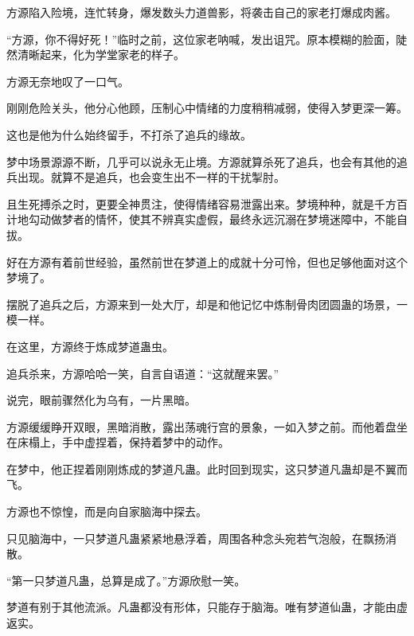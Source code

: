 \begin{this_body}
方源陷入险境，连忙转身，爆发数头力道兽影，将袭击自己的家老打爆成肉酱。

“方源，你不得好死！”临时之前，这位家老呐喊，发出诅咒。原本模糊的脸面，陡然清晰起来，化为学堂家老的样子。

方源无奈地叹了一口气。

刚刚危险关头，他分心他顾，压制心中情绪的力度稍稍减弱，使得入梦更深一筹。

这也是他为什么始终留手，不打杀了追兵的缘故。

梦中场景源源不断，几乎可以说永无止境。方源就算杀死了追兵，也会有其他的追兵出现。就算不是追兵，也会变生出不一样的干扰掣肘。

且生死搏杀之时，更要全神贯注，使得情绪容易泄露出来。梦境种种，就是千方百计地勾动做梦者的情怀，使其不辨真实虚假，最终永远沉溺在梦境迷障中，不能自拔。

好在方源有着前世经验，虽然前世在梦道上的成就十分可怜，但也足够他面对这个梦境了。

摆脱了追兵之后，方源来到一处大厅，却是和他记忆中炼制骨肉团圆蛊的场景，一模一样。

在这里，方源终于炼成梦道蛊虫。

追兵杀来，方源哈哈一笑，自言自语道：“这就醒来罢。”

说完，眼前骤然化为乌有，一片黑暗。

方源缓缓睁开双眼，黑暗消散，露出荡魂行宫的景象，一如入梦之前。而他着盘坐在床榻上，手中虚捏着，保持着梦中的动作。

在梦中，他正捏着刚刚炼成的梦道凡蛊。此时回到现实，这只梦道凡蛊却是不翼而飞。

方源也不惊惶，而是向自家脑海中探去。

只见脑海中，一只梦道凡蛊紧紧地悬浮着，周围各种念头宛若气泡般，在飘扬消散。

“第一只梦道凡蛊，总算是成了。”方源欣慰一笑。

梦道有别于其他流派。凡蛊都没有形体，只能存于脑海。唯有梦道仙蛊，才能由虚返实。

\end{this_body}

